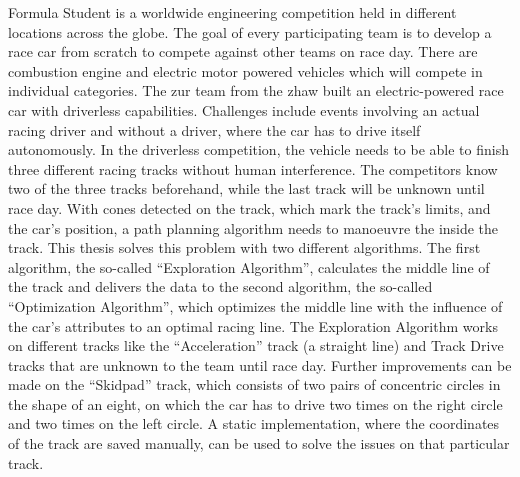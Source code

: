 Formula Student is a worldwide engineering competition held in different locations across the globe. The goal of every participating team is to develop a race car from scratch to compete against other teams on race day. There are combustion engine and electric motor powered vehicles which will compete in individual categories. The \acrlong{zur} team from the \acrlong{zhaw} built an electric-powered race car with driverless capabilities. Challenges include events involving an actual racing driver and without a driver, where the car has to drive itself autonomously. In the driverless competition, the vehicle needs to be able to finish three different racing tracks without human interference. The competitors know two of the three tracks beforehand, while the last track will be unknown until race day. With cones detected on the track, which mark the track's limits, and the car's position, a path planning algorithm needs to manoeuvre the inside the track. This thesis solves this problem with two different algorithms. The first algorithm, the so-called ``Exploration Algorithm'', calculates the middle line of the track and delivers the data to the second algorithm, the so-called ``Optimization Algorithm'', which optimizes the middle line with the influence of the car's attributes to an optimal racing line. The Exploration Algorithm works on different tracks like the ``Acceleration'' track (a straight line) and Track Drive tracks that are unknown to the team until race day. Further improvements can be made on the ``Skidpad'' track, which consists of two pairs of concentric circles in the shape of an eight, on which the car has to drive two times on the right circle and two times on the left circle. A static implementation, where the coordinates of the track are saved manually, can be used to solve the issues on that particular track.
